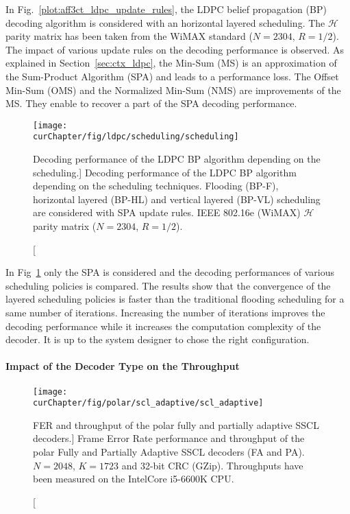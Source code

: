In Fig.~\ref{plot:aff3ct_ldpc_update_rules}, the LDPC belief propagation (BP)
decoding algorithm is considered with an horizontal layered scheduling. The
$\mathcal{H}$ parity matrix has been taken from the WiMAX standard ($N=2304$,
$R=1/2$). The impact of various update rules on the decoding performance is
observed. As explained in Section~\ref{sec:ctx_ldpc}, the Min-Sum (MS) is an
approximation of the Sum-Product Algorithm (SPA) and leads to a performance
loss. The Offset Min-Sum (OMS) and the Normalized Min-Sum (NMS) are improvements
of the MS. They enable to recover a part of the SPA decoding performance.

\begin{figure}[htp]
  \centering
  \texttt{[image: \\curChapter/fig/ldpc/scheduling/scheduling]}
  \caption
    [Decoding performance of the LDPC BP algorithm depending on the scheduling.]
    {Decoding performance of the LDPC BP algorithm depending on the scheduling
     techniques. Flooding (BP-F), horizontal layered (BP-HL) and vertical
     layered (BP-VL) scheduling are considered with SPA update rules. IEEE
     802.16e (WiMAX) $\mathcal{H}$ parity matrix ($N=2304$, $R=1/2$).}
  \label{plot:aff3ct_ldpc_scheduling}
\end{figure}

In Fig~\ref{plot:aff3ct_ldpc_scheduling} only the SPA is considered
and the decoding performances of various scheduling policies is compared. The
results show that the convergence of the layered scheduling policies is faster
than the traditional flooding scheduling for a same number of iterations.
Increasing the number of iterations improves the decoding performance while it
increases the computation complexity of the decoder. It is up to the system
designer to chose the right configuration.

\paragraph{Impact of the Decoder Type on the Throughput}

\begin{figure}[htp]
  \centering
  \texttt{[image: \\curChapter/fig/polar/scl\_adaptive/scl\_adaptive]}
  \caption
    [FER and throughput of the polar fully and partially adaptive SSCL
     decoders.]
    {Frame Error Rate performance and throughput of the polar Fully and
     Partially Adaptive SSCL decoders (FA and PA). $N = 2048$, $K = 1723$ and
     32-bit CRC (GZip). Throughputs have been measured on the Intel\R Core\TM
     i5-6600K CPU.}
  \label{plot:aff3ct_polar_scl_adaptive}
\end{figure}

